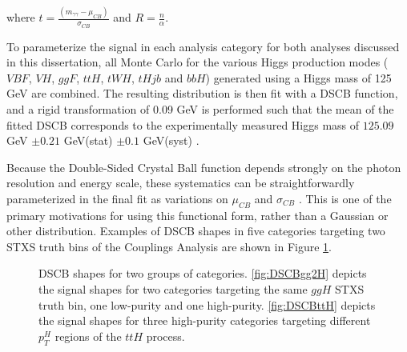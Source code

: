 where $t = \frac{(m_{\gamma \gamma} - \mu_{CB})}{\sigma_{CB}}$ and $R = \frac{n}{\alpha}$. 

To parameterize the signal in each analysis category for both analyses discussed in this dissertation, all Monte Carlo for the various Higgs production modes ($VBF$, $VH$, $ggF$, $ttH$, $tWH$, $tHjb$ and $bbH$) generated using a Higgs mass of 125 GeV are combined. The resulting distribution is then fit with a DSCB function, and a rigid transformation of 0.09 GeV is performed such that the mean of the fitted DSCB corresponds to the experimentally measured Higgs mass of $125.09$ GeV $\pm 0.21$ GeV(stat) $\pm 0.1$ GeV(syst) \cite{Higgsmass}.

Because the Double-Sided Crystal Ball function depends strongly on the photon resolution and energy scale, these systematics can be straightforwardly parameterized in the final fit as variations on $\mu_{CB}$ and $\sigma_{CB}$ \cite{gammaID}. This is one of the primary motivations for using this functional form, rather than a Gaussian or other distribution. Examples of DSCB shapes in five categories targeting two STXS truth bins of the Couplings Analysis are shown in Figure \ref{fig:DSCB}.

\begin{figure}[h]
\centering
{}
\caption{DSCB shapes for two groups of categories. \ref{fig:DSCBgg2H} depicts the signal shapes for two categories targeting the same $ggH$ STXS truth bin, one low-purity and one high-purity. \ref{fig:DSCBttH} depicts the signal shapes for three high-purity categories targeting different $p_{T}^{H}$ regions of the $ttH$ process.}
\label{fig:DSCB}
\end{figure}


